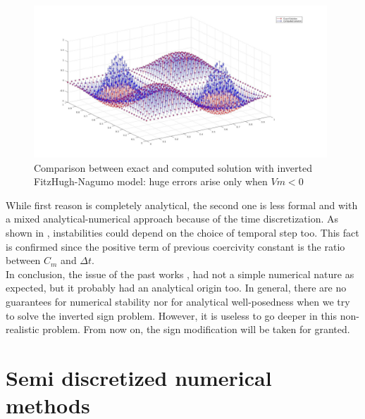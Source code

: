 \documentclass[a4paper,11pt]{article}
\begin{document}
    \begin{figure}[h]
    	\begin{center}
    		\includegraphics[width = 11cm]{./sol_ill_posed.jpg}
    		\caption{Comparison between exact and computed solution with inverted FitzHugh-Nagumo model: huge errors arise only when $Vm<0$}
    		\label{sol_ill_posed}
    	\end{center}
    \end{figure}

    \noindent While first reason is completely analytical, the second one is less formal and with a mixed analytical-numerical approach because of the time discretization. As shown in \cite{andreotti}, instabilities could depend on the choice of temporal step too. This fact is confirmed since the positive term of previous coercivity constant is the ratio between $C_m$ and $\Delta t$. \\
    \noindent In conclusion, the issue of the past works \cite{andreotti}, \cite{marta} had not a simple numerical nature as expected, but it probably had an analytical origin too. In general, there are no guarantees for numerical stability nor for analytical well-posedness when we try to solve the inverted sign problem. However, it is useless to go deeper in this non-realistic problem. From now on, the sign modification will be taken for granted.

\newpage

    \section{Semi discretized numerical methods}
\end{document}
